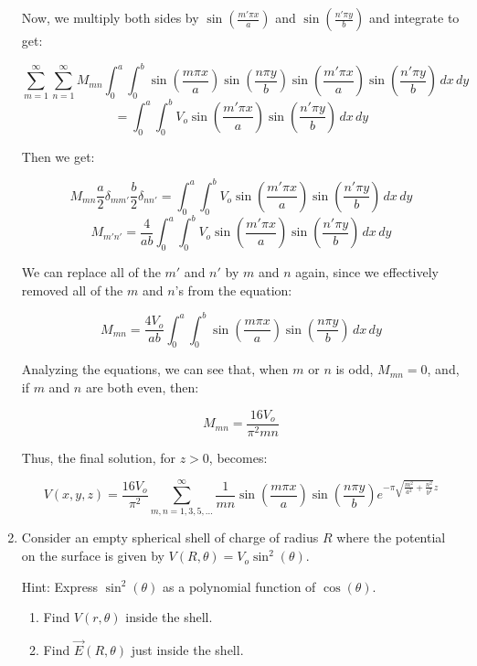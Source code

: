 \begin{enumerate}
        Now, we multiply both sides by $\sin\left( \frac{m'\pi x}{a} \right)$ and $\sin\left( \frac{n'\pi y}{b} \right)$ and integrate to get:

        $$\sum_{m=1}^\infty\sum_{n=1}^\infty M_{mn}\int_0^a\int_0^b\sin\left( \frac{m\pi x}{a} \right)\sin\left( \frac{n\pi y}{b} \right)\sin\left( \frac{m'\pi x}{a} \right)\sin\left( \frac{n'\pi y}{b} \right)\,dx\,dy$$
        $$=\int_0^a\int_0^b V_o\sin\left( \frac{m'\pi x}{a} \right)\sin\left( \frac{n'\pi y}{b} \right)\,dx\,dy$$

        Then we get:

        $$M_{mn}\frac{a}{2}\delta_{mm'}\frac{b}{2}\delta_{nn'}=\int_0^a\int_0^b V_o\sin\left( \frac{m'\pi x}{a} \right)\sin\left( \frac{n'\pi y}{b} \right)\,dx\,dy$$
        $$M_{m'n'}=\frac{4}{ab}\int_0^a\int_0^b V_o\sin\left( \frac{m'\pi x}{a} \right)\sin\left( \frac{n'\pi y}{b} \right)\,dx\,dy$$

        We can replace all of the $m'$ and $n'$ by $m$ and $n$ again, since we effectively removed all of the $m$ and $n$'s from the equation:

        $$M_{mn}=\frac{4V_o}{ab}\int_0^a\int_0^b\sin\left( \frac{m\pi x}{a} \right)\sin\left( \frac{n\pi y}{b} \right)\,dx\,dy$$

        Analyzing the equations, we can see that, when $m$ or $n$ is odd, $M_{mn}=0$, and, if $m$ and $n$ are both even, then:

        $$M_{mn}=\frac{16V_o}{\pi^2mn}$$

        Thus, the final solution, for $z>0$, becomes:

        $$\boxed{V(x,y,z)=\frac{16V_o}{\pi^2}\sum_{m,n=1,3,5,\ldots}^{\infty}\frac{1}{mn}\sin\left( \frac{m\pi x}{a} \right)\sin\left( \frac{n\pi y}{b} \right)e^{-\pi\sqrt{\frac{m^2}{a^2}+\frac{n^2}{b^2}}z}}$$

  \item Consider an empty spherical shell of charge of radius $R$ where the potential on the surface is given by $V(R, \theta) = V_o\sin^2(\theta)$.

    Hint: Express $\sin^2(\theta)$ as a polynomial function of $\cos(\theta)$.

    \begin{enumerate}

      \item Find $V(r, \theta)$ inside the shell.

      \item Find $\vec{E}(R,\theta)$ just inside the shell.


\end{enumerate}
\end{enumerate}
